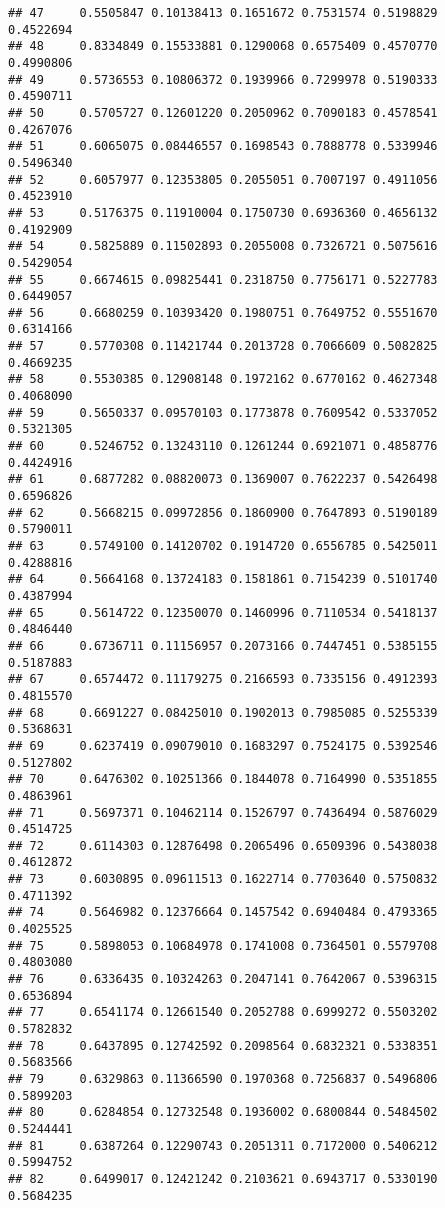 \documentclass[]{article}
\begin{document}
\begin{verbatim}
## 47     0.5505847 0.10138413 0.1651672 0.7531574 0.5198829    0.4522694
## 48     0.8334849 0.15533881 0.1290068 0.6575409 0.4570770    0.4990806
## 49     0.5736553 0.10806372 0.1939966 0.7299978 0.5190333    0.4590711
## 50     0.5705727 0.12601220 0.2050962 0.7090183 0.4578541    0.4267076
## 51     0.6065075 0.08446557 0.1698543 0.7888778 0.5339946    0.5496340
## 52     0.6057977 0.12353805 0.2055051 0.7007197 0.4911056    0.4523910
## 53     0.5176375 0.11910004 0.1750730 0.6936360 0.4656132    0.4192909
## 54     0.5825889 0.11502893 0.2055008 0.7326721 0.5075616    0.5429054
## 55     0.6674615 0.09825441 0.2318750 0.7756171 0.5227783    0.6449057
## 56     0.6680259 0.10393420 0.1980751 0.7649752 0.5551670    0.6314166
## 57     0.5770308 0.11421744 0.2013728 0.7066609 0.5082825    0.4669235
## 58     0.5530385 0.12908148 0.1972162 0.6770162 0.4627348    0.4068090
## 59     0.5650337 0.09570103 0.1773878 0.7609542 0.5337052    0.5321305
## 60     0.5246752 0.13243110 0.1261244 0.6921071 0.4858776    0.4424916
## 61     0.6877282 0.08820073 0.1369007 0.7622237 0.5426498    0.6596826
## 62     0.5668215 0.09972856 0.1860900 0.7647893 0.5190189    0.5790011
## 63     0.5749100 0.14120702 0.1914720 0.6556785 0.5425011    0.4288816
## 64     0.5664168 0.13724183 0.1581861 0.7154239 0.5101740    0.4387994
## 65     0.5614722 0.12350070 0.1460996 0.7110534 0.5418137    0.4846440
## 66     0.6736711 0.11156957 0.2073166 0.7447451 0.5385155    0.5187883
## 67     0.6574472 0.11179275 0.2166593 0.7335156 0.4912393    0.4815570
## 68     0.6691227 0.08425010 0.1902013 0.7985085 0.5255339    0.5368631
## 69     0.6237419 0.09079010 0.1683297 0.7524175 0.5392546    0.5127802
## 70     0.6476302 0.10251366 0.1844078 0.7164990 0.5351855    0.4863961
## 71     0.5697371 0.10462114 0.1526797 0.7436494 0.5876029    0.4514725
## 72     0.6114303 0.12876498 0.2065496 0.6509396 0.5438038    0.4612872
## 73     0.6030895 0.09611513 0.1622714 0.7703640 0.5750832    0.4711392
## 74     0.5646982 0.12376664 0.1457542 0.6940484 0.4793365    0.4025525
## 75     0.5898053 0.10684978 0.1741008 0.7364501 0.5579708    0.4803080
## 76     0.6336435 0.10324263 0.2047141 0.7642067 0.5396315    0.6536894
## 77     0.6541174 0.12661540 0.2052788 0.6999272 0.5503202    0.5782832
## 78     0.6437895 0.12742592 0.2098564 0.6832321 0.5338351    0.5683566
## 79     0.6329863 0.11366590 0.1970368 0.7256837 0.5496806    0.5899203
## 80     0.6284854 0.12732548 0.1936002 0.6800844 0.5484502    0.5244441
## 81     0.6387264 0.12290743 0.2051311 0.7172000 0.5406212    0.5994752
## 82     0.6499017 0.12421242 0.2103621 0.6943717 0.5330190    0.5684235

\end{verbatim}
\end{document}
